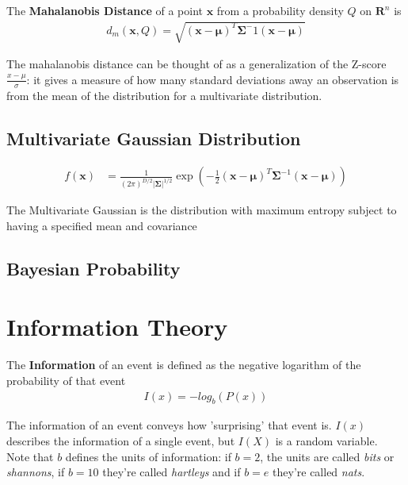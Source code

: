 \documentclass[a4paper]{article}
\newcommand{\nl}{\vspace{0.2cm}\\}
\newcommand{\mf}{\mathbf}
\begin{document}
\begin{defn}
The \textbf{Mahalanobis Distance} of a point $\bm{x}$ from a probability density $Q$ on $\bm{R}^n$ is 
\begin{align}
d_m(\mf{x},Q) = \sqrt{(\mf{x}-\bm{\mu})^T \mf{\Sigma}^-1 (\mf{x}-\bm{\mu})}
\end{align}
\end{defn}

The mahalanobis distance can be thought of as a generalization of the Z-score $\frac{x - \mu}{\sigma}$: it gives a measure of how many standard deviations away an observation is from the mean of the distribution for a multivariate distribution. 

\subsection{Multivariate Gaussian Distribution}

\begin{align}
  f(\mf{x}) &= \frac{1}{(2\pi)^{D/2}|\mf{\Sigma}|^{1/2}} \exp\left(-\frac{1}{2}(\mf{x}-\bm{\mu})^T\mf{\Sigma}^{-1}(\mf{x}-\bm{\mu})\right)
\end{align}

\begin{theorem}
  The Multivariate Gaussian is the distribution with maximum entropy subject to having a specified mean and covariance
\end{theorem}

\subsection{Bayesian Probability}

\section{Information Theory}

\begin{defn}
  The \textbf{Information} of an event is defined as the negative logarithm of the probability of that event
  \begin{align}
    I(x) = -log_b(P(x))
  \end{align}
\end{defn}

The information of an event conveys how 'surprising' that event is. $I(x)$ describes the information of a single event, but $I(X)$ is a random variable. \nl

Note that $b$ defines the units of information: if $b=2$, the units are called \textit{bits} or \textit{shannons}, if $b=10$ they're called \textit{hartleys} and if $b=e$ they're called \textit{nats}. \nl
\end{document}
